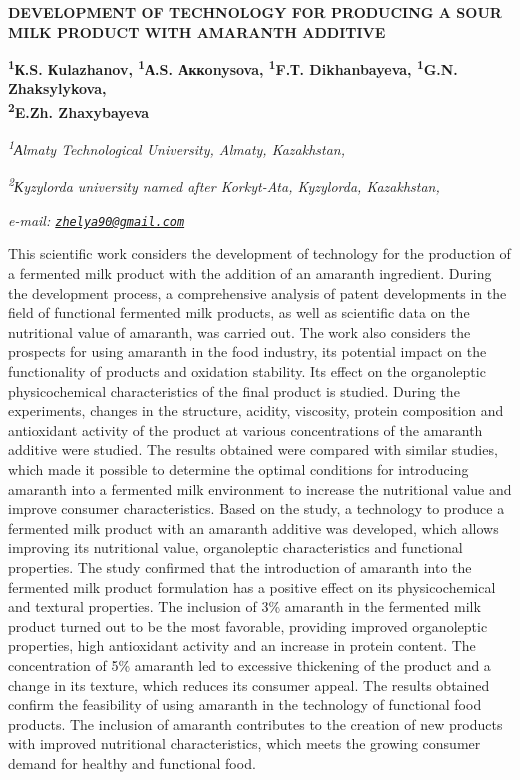 {{\bfseries DEVELOPMENT OF TECHNOLOGY FOR PRODUCING A SOUR MILK PRODUCT WITH
AMARANTH ADDITIVE}

{\bfseries \textsuperscript{1}К.S. Кulazhanov, \textsuperscript{1}А.S.
Аккonysova\textsuperscript{\envelope }, \textsuperscript{1}F.Т. Dikhanbayeva,
\textsuperscript{1}G.N. Zhaksylykova,\\
\textsuperscript{2}E.Zh. Zhaxybayeva}

\emph{\textsuperscript{1}Аlmaty Technological University, Almaty,
Kazakhstan,}

\emph{\textsuperscript{2}Кyzylorda university named after Korkyt-Ata,
Kyzylorda, Kazakhstan,}

\emph{e-mail:
\href{mailto:zhelya90@gmail.com}{\nolinkurl{zhelya90@gmail.com}}}

This scientific work considers the development of technology for the
production of a fermented milk product with the addition of an amaranth
ingredient. During the development process, a comprehensive analysis of
patent developments in the field of functional fermented milk products,
as well as scientific data on the nutritional value of amaranth, was
carried out. The work also considers the prospects for using amaranth in
the food industry, its potential impact on the functionality of products
and oxidation stability. Its effect on the organoleptic physicochemical
characteristics of the final product is studied. During the experiments,
changes in the structure, acidity, viscosity, protein composition and
antioxidant activity of the product at various concentrations of the
amaranth additive were studied. The results obtained were compared with
similar studies, which made it possible to determine the optimal
conditions for introducing amaranth into a fermented milk environment to
increase the nutritional value and improve consumer characteristics.
Based on the study, a technology to produce a fermented milk product
with an amaranth additive was developed, which allows improving its
nutritional value, organoleptic characteristics and functional
properties. The study confirmed that the introduction of amaranth into
the fermented milk product formulation has a positive effect on its
physicochemical and textural properties. The inclusion of 3\% amaranth
in the fermented milk product turned out to be the most favorable,
providing improved organoleptic properties, high antioxidant activity
and an increase in protein content. The concentration of 5\% amaranth
led to excessive thickening of the product and a change in its texture,
which reduces its consumer appeal. The results obtained confirm the
feasibility of using amaranth in the technology of functional food
products. The inclusion of amaranth contributes to the creation of new
products with improved nutritional characteristics, which meets the
growing consumer demand for healthy and functional food.

}
